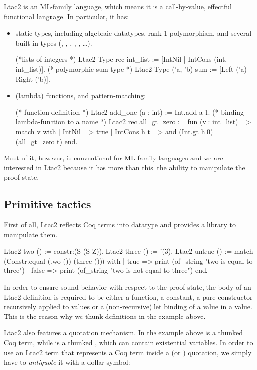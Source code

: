 Ltac2 is an ML-family language, which means it is a call-by-value, effectful functional language.
In particular, it has:
\begin{itemize}
\item static types, including algebraic datatypes, rank-1 polymorphism, and several built-in types (, , , , , \ldots).
  \begin{coq}
  (*lists of integers *)
  Ltac2 Type rec int_list := [IntNil | IntCons (int, int_list)].
  (* polymorphic sum type *)
  Ltac2 Type ('a, 'b) sum := [Left ('a) | Right ('b)].
  \end{coq}
\item (lambda) functions, and pattern-matching:
  \begin{coq}
  (* function definition *)
  Ltac2 add_one (a : int) := Int.add a 1.
  (* binding lambda-function to a name *)
  Ltac2 rec all_gt_zero := fun (v : int_list) =>
    match v with
    | IntNil => true
    | IntCons h t => and (Int.gt h 0) (all_gt_zero t)
    end.
  \end{coq}
\end{itemize}

Most of it, however, is conventional for ML-family languages and  we are interested in Ltac2 because it has more than this: the ability to manipulate the proof state.

\subsection{Primitive tactics}
\label{sec:primitive-tactics}

First of all, Ltac2 reflects Coq terms into  datatype and provides a library to manipulate them.

\begin{coq}
Ltac2 two () := constr:(S (S Z)).
Ltac2 three () := '(3).
Ltac2 untrue () := match (Constr.equal (two ()) (three ())) with
  | true => print (of_string "two is equal to three")
  | false => print (of_string "two is not equal to three")
  end.
\end{coq}

In order to ensure sound behavior with respect to the proof state, the body of an Ltac2 definition is required to be either a function, a constant, a pure constructor recursively applied to values or a (non-recursive) let binding of a value in a value.
This is the reason why we thunk definitions in the example above.

Ltac2 also features a quotation mechanism.
In the example above  is a thunked Coq term, while  is a thunked , which can contain existential variables.
In order to use an Ltac2 term that represents a Coq term inside a  (or ) quotation, we simply have to \emph{antiquote} it with a dollar symbol:

